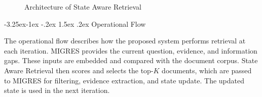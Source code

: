 \documentclass[12pt,a4paper]{report}
\makeatletter
\renewcommand\subsection{\@startsection{subsection}{2}{\z@}%
    {-3.25ex\@plus -1ex \@minus -.2ex}%
    {1.5ex \@plus .2ex}%
    {\normalfont\fontsize{14}{17}\selectfont\bfseries}}
\makeatother
\begin{document}
\begin{figure}[H]

\caption{Architecture of State Aware Retrieval}
\label{fig:sar-architecture}
\end{figure}

\clearpage

\subsection{Operational Flow}

The operational flow describes how the proposed system performs retrieval at each iteration. MIGRES provides the current question, evidence, and information gaps. These inputs are embedded and compared with the document corpus. State Aware Retrieval then scores and selects the top-$K$ documents, which are passed to MIGRES for filtering, evidence extraction, and state update. The updated state is used in the next iteration.
\end{document}
